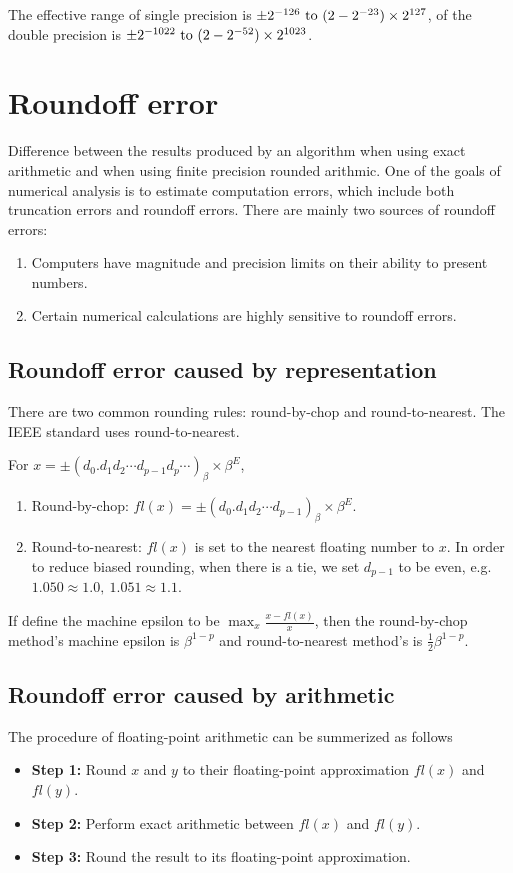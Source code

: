 \documentclass[12pt,a4paper]{extarticle}
\numberwithin{equation}{section}
\numberwithin{figure}{section}
\numberwithin{table}{section}
\theoremstyle{definition}
\begin{document}
The effective range of single precision is $\pm 2^{-126}\ {\rm to}\ (2-2^{-23})\times 2^{127}$, of the double precision is $\pm 2^{-1022}\ {\rm to}\ (2-2^{-52})\times 2^{1023}$.

\section{Roundoff error}
Difference between the results produced by an algorithm when using exact arithmetic and when using finite precision rounded arithmic. One of the goals of numerical analysis is to estimate computation errors, which include both truncation errors and roundoff errors. There are mainly two sources of roundoff errors:
\begin{enumerate}
    \item Computers have magnitude and precision limits on their ability to present numbers.
    \item Certain numerical calculations are highly sensitive to roundoff errors.
\end{enumerate}
\subsection{Roundoff error caused by representation}
There are two common rounding rules: round-by-chop and round-to-nearest. The IEEE standard uses round-to-nearest. \par For $x = \pm (d_0.d_1d_2\cdots d_{p-1}d_p\cdots)_{\beta}\times \beta^E$,
\begin{enumerate}
    \item Round-by-chop: $fl(x) = \pm (d_0.d_1d_2\cdots d_{p-1})_{\beta}\times \beta^E$.
    \item Round-to-nearest: $fl(x)$ is set to the nearest floating number to $x$. In order to reduce biased rounding, when there is a tie, we set $d_{p-1}$ to be even, e.g. $1.050\approx 1.0,\ 1.051\approx 1.1$.\
\end{enumerate}

If define the machine epsilon to be $\max_x \frac{x-fl(x)}{x}$, then the round-by-chop method's machine epsilon is $\beta^{1-p}$ and round-to-nearest method's is $\frac{1}{2}\beta^{1-p}$.
\subsection{Roundoff error caused by arithmetic}
The procedure of floating-point arithmetic can be summerized as follows
\begin{itemize}
    \item {\bf Step 1:} Round $x$ and $y$ to their floating-point approximation $fl(x)$ and $fl(y)$.
    \item {\bf Step 2:} Perform exact arithmetic between $fl(x)$ and $fl(y)$.
    \item {\bf Step 3:} Round the result to its floating-point approximation.
\end{itemize}
\end{document}

